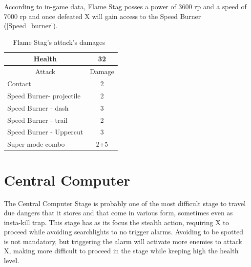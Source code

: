 According to in-game data, Flame Stag posses a power of 3600 rp and a speed of 7000 rp and once defeated X will gain access to the Speed Burner (\ref{Speed_burner}).
\begin{table}[htp]
	\centering
	\begin{tabular}[h]{l c}
		
		\toprule
		\multicolumn{1}{c}{Health}  & 32 \\
		\midrule
		\multicolumn{1}{c}{Attack} & \multicolumn{1}{c}{Damage}\\
		Contact & 2 \\
		Speed Burner- projectile& 2\\
		Speed Burner - dash& 3\\
		Speed Burner - trail& 2\\
		Speed Burner - Uppercut& 3\\
		Super mode combo & 2+5\\
		\bottomrule
	\end{tabular}
	\caption{Flame Stag's attack's damages~\cite{wiki:Flame_stag}}
\end{table}
\section{Central Computer}
The Central Computer Stage is probably one of the most difficult stage to travel due dangers that it stores and that come in various form, sometimes even as insta-kill trap. This stage has as its focus the stealth action, requiring X to proceed while avoiding searchlights to no trigger alarms. Avoiding to be spotted is not mandatory, but triggering the alarm will activate more enemies to attack X, making more difficult to proceed in the stage while keeping high the health level.

